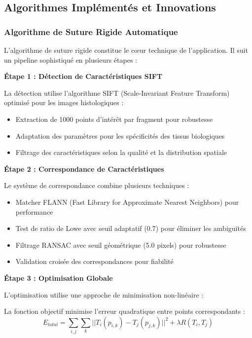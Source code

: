 \documentclass[12pt,a4paper]{article}
\begin{document}
\subsection{Algorithmes Implémentés et Innovations}

\subsubsection{Algorithme de Suture Rigide Automatique}

L'algorithme de suture rigide constitue le cœur technique de l'application. Il suit un pipeline sophistiqué en plusieurs étapes :

\textbf{Étape 1 : Détection de Caractéristiques SIFT}

La détection utilise l'algorithme SIFT (Scale-Invariant Feature Transform) optimisé pour les images histologiques :
\begin{itemize}
\item Extraction de 1000 points d'intérêt par fragment pour robustesse
\item Adaptation des paramètres pour les spécificités des tissus biologiques
\item Filtrage des caractéristiques selon la qualité et la distribution spatiale
\end{itemize}

\textbf{Étape 2 : Correspondance de Caractéristiques}

Le système de correspondance combine plusieurs techniques :
\begin{itemize}
\item Matcher FLANN (Fast Library for Approximate Nearest Neighbors) pour performance
\item Test de ratio de Lowe avec seuil adaptatif (0.7) pour éliminer les ambiguïtés
\item Filtrage RANSAC avec seuil géométrique (5.0 pixels) pour robustesse
\item Validation croisée des correspondances pour fiabilité
\end{itemize}

\textbf{Étape 3 : Optimisation Globale}

L'optimisation utilise une approche de minimisation non-linéaire :

La fonction objectif minimise l'erreur quadratique entre points correspondants :
\begin{equation}
E_{total} = \sum_{i,j} \sum_{k} ||T_i(p_{i,k}) - T_j(p_{j,k})||^2 + \lambda R(T_i, T_j)
\end{equation}
\end{document}
